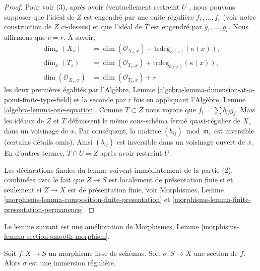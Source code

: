 \begin{proof}
\medskip\noindent
Pour voir (3), après avoir éventuellement restreint  $U$ , nous pouvons
supposer que l'idéal de  $Z$  est engendré par une suite régulière
 $f_1, \ldots, f_r$  (voir notre construction de  $Z$  ci-dessus) et que l'idéal de
 $T$  est engendré par  $g_1, \ldots, g_c$. Nous affirmons que  $c = r$. À
savoir,
\begin{align*}
\dim_x(X_s) & = \dim(\mathcal{O}_{X_s, x}) +
\text{trdeg}_{\kappa(s)}(\kappa(x)), \\
\dim_x(T_s) & = \dim(\mathcal{O}_{T_s, x}) +
\text{trdeg}_{\kappa(s)}(\kappa(x)), \\
\dim(\mathcal{O}_{X_s, x}) & = \dim(\mathcal{O}_{T_s, x}) + r
\end{align*}
les deux premières égalités par l’Algèbre, Lemme  \ref{algebra-lemma-dimension-at-a-point-finite-type-field}  et la seconde par
 $r$  fois en appliquant l’Algèbre, Lemme  \ref{algebra-lemma-one-equation}. Comme  $T \subset Z$ 
nous voyons que  $f_i = \sum b_{ij} g_j$. Mais les idéaux de  $Z$  et  $T$ 
définissent le même sous-schéma fermé quasi-régulier de  $X_s$  dans un
voisinage de  $x$. Par conséquent, la matrice  $(b_{ij}) \bmod \mathfrak m_x$  est inversible
(certains détails omis). Ainsi  $(b_{ij})$  est inversible dans un voisinage
ouvert de  $x$. En d’autres termes,  $T \cap U = Z$  après avoir restreint
 $U$.

\medskip\noindent
Les déclarations finales du lemme suivent immédiatement de la partie (2),
combinées avec le fait que  $Z \to S$  est localement de présentation finie si et
seulement si  $Z \to X$  est de présentation finie, voir Morphismes, Lemme
 \ref{morphisms-lemma-composition-finite-presentation}  et  \ref{morphisms-lemma-finite-presentation-permanence}.
\end{proof}

\noindent
Le lemme suivant est une amélioration de Morphismes, Lemme  \ref{morphisms-lemma-section-smooth-morphism}.

\begin{lemma}
\label{lemma-section-smooth-regular-immersion}
Soit  $f : X \to S$  un morphisme lisse de schémas. Soit  $\sigma : S \to X$  une section de
 $f$. Alors  $\sigma$  est une immersion régulière.
\end{lemma}

